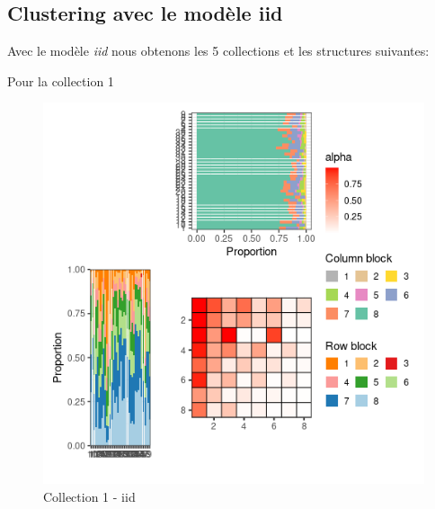 \hypertarget{clustering-avec-le-moduxe8le-iid}{%
\subsection{Clustering avec le modèle
iid}\label{clustering-avec-le-moduxe8le-iid}}

Avec le modèle \emph{iid} nous obtenons les 5 collections et les
structures suivantes:

Pour la collection 1

\begin{figure}
\centering
\includegraphics{figure/iid_meso_plot-1.png}
\caption{Collection 1 - iid}
\end{figure}

